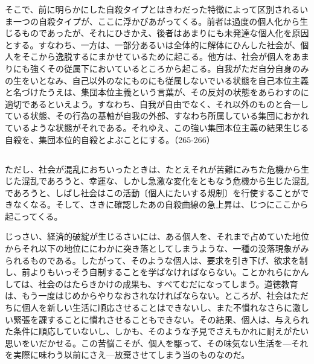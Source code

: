 そこで、前に明らかにした自殺タイプとはきわだった特徴によって区別されるいま一つの自殺タイプが、ここに浮かびあがってくる。前者は過度の個人化から生じるものであったが、それにひきかえ、後者はあまりにも未発達な個人化を原因とする。すなわち、一方は、一部分あるいは全体的に解体にひんした社会が、個人をそこから逸脱するにまかせているために起こる。他方は、社会が個人をあまりにも強くその従属下においているところから起こる。自我がただ自分自身のみの生をいとなみ、自己以外のなにものにも従属しないでいる状態を自己本位主義と名づけたうえは、集団本位主義という言葉が、その反対の状態をあらわすのに適切であるといえよう。すなわち、自我が自由でなく、それ以外のものと合一している状態、その行為の基軸が自我の外部、すなわち所属している集団におかれているような状態がそれである。それゆえ、この強い集団本位主義の結果生じる自殺を、集団本位的自殺とよぶことにする。（265-266）

\subsection{}



ただし、社会が混乱におちいったときは、たとえそれが苦難にみちた危機から生じた混乱であろうと、幸運な、しかし急激な変化をともなう危機から生じた混乱であろうと、しばし社会はこの活動〔個人にたいする規制〕を行使することができなくなる。そして、さきに確認したあの自殺曲線の急上昇は、じつにここから起こってくる。

じっさい、経済的破綻が生じるさいには、ある個人を、それまで占めていた地位からそれ以下の地位ににわかに突き落としてしまうような、一種の没落現象がみられるものである。したがって、そのような個人は、要求を引き下げ、欲求を制し、前よりもいっそう自制することを学ばなければならない。ことかれらにかんしては、社会のはたらきかけの成果も、すべてむだになってしまう。道徳教育は、もう一度はじめからやりなおされなければならない。ところが、社会はただちに個人を新しい生活に順応させることはできないし、また不慣れなさらに激しい緊張を課することに慣れさせることもできない。その結果、個人は、与えられた条件に順応していないし、しかも、そのような予見でさえもかれに耐えがたい思いをいだかせる。この苦悩こそが、個人を駆って、その味気ない生活を{\——}それを実際に味わう以前にさえ{\——}放棄させてしまう当のものなのだ。


